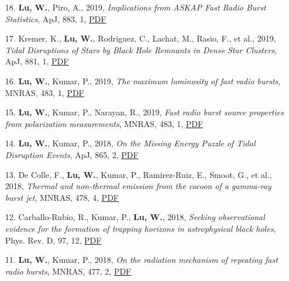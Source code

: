\begin{itemize}[leftmargin=0.65cm]
\vspace{-0.1cm}
\item[18.]{{\bf Lu, W.}, Piro, A., 2019, {\it Implications from ASKAP Fast Radio Burst Statistics}, ApJ, 883, 1, \href{https://ui.adsabs.harvard.edu/abs/2019ApJ...883...40L}{\underline{PDF}}}

\vspace{-0.1cm}
\item[17.]{Kremer, K., {\bf Lu, W.}, Rodriguez, C., Lachat, M., Rasio, F., et al., 2019, {\it Tidal Disruptions of Stars by Black Hole Remnants in Dense Star Clusters}, ApJ, 881, 1, \href{https://ui.adsabs.harvard.edu/abs/2019ApJ...881...75K}{\underline{PDF}}}

\vspace{-0.1cm}
\item[16.]{{\bf Lu, W.}, Kumar, P., 2019, {\it The maximum luminosity of fast radio bursts}, MNRAS, 483, 1, \href{https://ui.adsabs.harvard.edu/abs/2019MNRAS.483L..93L}{\underline{PDF}}}

\vspace{-0.1cm}
\item[15.]{{\bf Lu, W.}, Kumar, P., Narayan, R., 2019, {\it Fast radio burst source properties from polarization measurements}, MNRAS, 483, 1, \href{https://ui.adsabs.harvard.edu/abs/2019MNRAS.483..359L}{\underline{PDF}}}

\vspace{-0.1cm}
\item[14.]{{\bf Lu, W.}, Kumar, P., 2018, {\it On the Missing Energy Puzzle of Tidal Disruption Events}, ApJ, 865, 2, \href{https://ui.adsabs.harvard.edu/abs/2018ApJ...865..128L}{\underline{PDF}}}

\vspace{-0.1cm}
\item[13.]{De Colle, F., {\bf Lu, W.}, Kumar, P., Ramirez-Ruiz, E., Smoot, G., et al., 2018, {\it Thermal and non-thermal emission from the cocoon of a gamma-ray burst jet}, MNRAS, 478, 4, \href{https://ui.adsabs.harvard.edu/abs/2018MNRAS.478.4553D}{\underline{PDF}}}

\vspace{-0.1cm}
\item[12.]{Carballo-Rubio, R., Kumar, P., {\bf Lu, W.}, 2018, {\it Seeking observational evidence for the formation of trapping horizons in astrophysical black holes}, Phys. Rev. D, 97, 12, \href{https://ui.adsabs.harvard.edu/abs/2018PhRvD..97l3012C}{\underline{PDF}}}

\vspace{-0.1cm}
\item[11.]{{\bf Lu, W.}, Kumar, P., 2018, {\it On the radiation mechanism of repeating fast radio bursts}, MNRAS, 477, 2, \href{https://ui.adsabs.harvard.edu/abs/2018MNRAS.477.2470L}{\underline{PDF}}}


\end{itemize}
